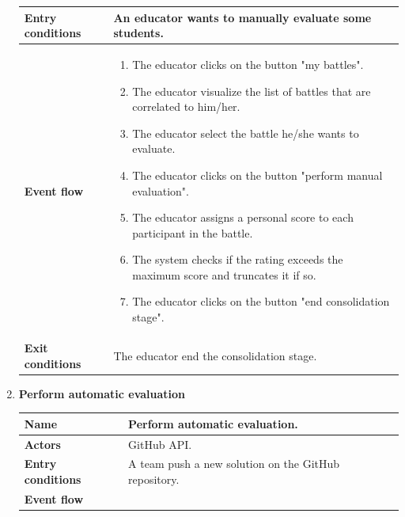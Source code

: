 \begin{enumerate}[label=\textbf{UC.\arabic*}]
\begin{table}[H]
\begin{tabular}{|m{3.2cm}|m{9.8cm}|}
                    \hline
                    \textbf{Entry conditions}  & An educator wants to manually evaluate some students. \\
                    \hline
                    \textbf{Event flow}  & 
                    \begin{enumerate}[label=\arabic*.]
                        \item The educator clicks on the button "my battles".
                        \item The educator visualize the list of battles that are correlated to him/her.
                        \item The educator select the battle he/she wants to evaluate.
                        \item The educator clicks on the button "perform manual evaluation".
                        \item The educator assigns a personal score to each participant in the battle.
                        \item The system checks if the rating exceeds the maximum score and truncates it if so.
                        \item The educator clicks on the button "end consolidation stage".
                    \end{enumerate}\\ 
                    \hline
                    \textbf{Exit conditions}  &  The educator end the consolidation stage. \\
                    \hline
                \end{tabular}
        \end{table}
        \item {} \textbf{Perform automatic evaluation}
        \begin{table}[H]
    	    \centering
                \renewcommand{\arraystretch}{1.5}
                \begin{tabular}{|m{3.2cm}|m{9.8cm}|}
                    \hline
                    \textbf{Name} & Perform automatic evaluation. \\
                    \hline
                    \textbf{Actors} & GitHub API. \\
                    \hline
                    \textbf{Entry conditions}  & A team push a new solution on the GitHub repository. \\
                    \hline
                    \textbf{Event flow}  & 
                    \begin{enumerate}[label=\arabic*.]

\end{enumerate}
\end{tabular}
\end{table}
\end{enumerate}

